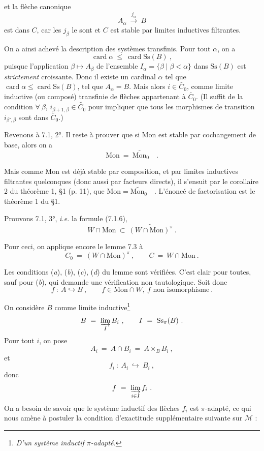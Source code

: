 \documentclass[11pt]{article}
\newcommand{\printedpage}[1]{\marginpar{\raggedright\footnotesize p.~#1}}
\newcommand{\msp}[1]{\marginpar{\raggedright\footnotesize [#1]}}
\newcommand{\Ss}{\mathrm{Ss}}
\newcommand{\card}{\operatorname{card}}
\newcommand{\Mon}{\mathrm{Mon}}
\begin{document}
\msp{page 93}

et la flèche canonique
\[
A_\alpha \ \xrightarrow{j_\alpha} \ B
\]
est dans $C$, car les $j_\beta$ le sont et $C$ est stable par limites inductives filtrantes.

On a ainsi achevé la description des systèmes transfinis. Pour tout $\alpha$, on a
\[
\card \alpha \ \leq \ \card \Ss(B) \ ,
\]
puisque l'application $\beta \longmapsto A_\beta$ de l'ensemble $I_\alpha = \{\beta \mid \beta < \alpha\}$ dans $\Ss(B)$ est \textit{strictement} croissante. Donc il existe un cardinal $\alpha$ tel que $\card \alpha \leq \card \Ss(B)$, tel que $A_\alpha = B$. Mais alors $i \in \widetilde{C_0}$, comme limite inductive (ou composé) transfinie de flèches appartenant à $\widetilde{C_0}$. (Il suffit de la condition $\forall\ \beta$, $i_{\beta+1,\beta} \in \widetilde{C_0}$ pour impliquer que tous les morphismes de transition $i_{\beta',\beta}$ sont dans $\widetilde{C_0}$.)

Revenons à 7.1, 2°. Il reste à prouver que si Mon est stable par cochangement de base, alors on a
\[
\Mon \ = \ \widetilde{\Mon_0} \quad .
\]

Mais comme Mon est déjà stable par composition, et par limites inductives filtrantes quelconques (donc aussi par facteurs directs), il s'ensuit par le corollaire 2 du théorème 1, §1 (p. 11), que $\Mon = \widetilde{\Mon_0}$\ \ . L'énoncé de factorisation est le théorème 1 du §1.

\printedpage{52}

\msp{page 94}

Prouvons 7.1, 3°, \textit{i.e.} la formule (7.1.6),
\[
W \cap \Mon \ \subset \ \widetilde{(W \cap \Mon)^{\pi}} \ .
\]

Pour ceci, on applique encore le lemme 7.3 à
\[
C_0 \ = \ (W \cap \Mon)^{\pi} \ , \qquad C \ = \ W \cap \Mon \ .
\]

Les conditions (\textit{a}), (\textit{b}), (\textit{c}), (\textit{d}) du lemme sont vérifiées. C'est clair pour toutes, sauf pour (\textit{b}), qui demande une vérification non tautologique. Soit donc
\[
f \ : \ A \hookrightarrow B \ , \qquad f \in \Mon \cap W,\ f \text{ non isomorphisme} \ .
\]

On considère $B$ comme limite inductive\footnote[33]{\textit{D'un système inductif $\pi$-adapté.}}
\[
B \ = \ \varinjlim_{I} B_i \ , \qquad I \ = \ \Ss_{\pi}(B) \ .
\]
Pour tout $i$, on pose
\[
A_i \ = \ A \cap B_i \ = \ A \times_B B_i \ ,
\]
et
\[
f_i \ : \ A_i \ \hookrightarrow \ B_i \ ,
\]
donc
\[
f \ = \ \varinjlim_{i \in I} f_i \ .
\]
On a besoin de savoir que le système inductif des flèches $f_i$ est $\pi$-adapté, ce qui nous amène à postuler la condition d'exactitude supplémentaire suivante sur $\mathcal{M}$ :
\end{document}

